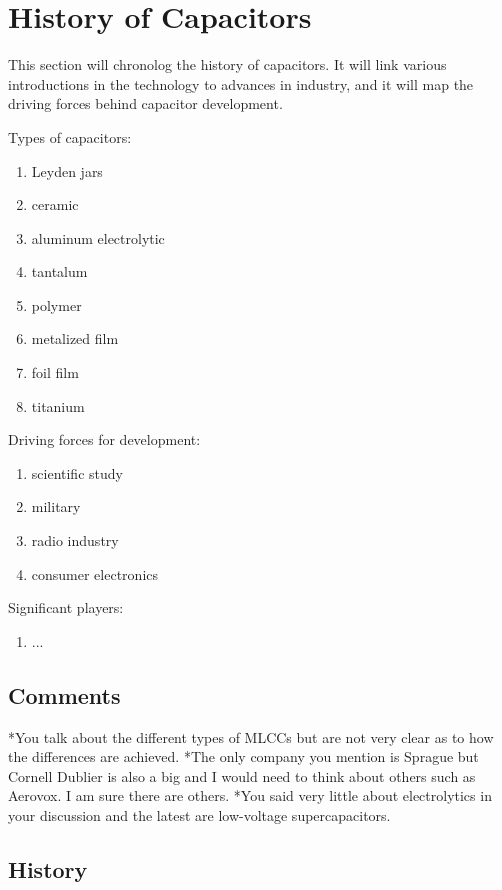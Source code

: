 \section {History of Capacitors}
This section will chronolog the history of capacitors. It will link various introductions in the technology to advances in industry, and it will map the driving forces behind capacitor development.

\noindent Types of capacitors:
\begin{enumerate}
    \item Leyden jars
    \item ceramic 
    \item aluminum electrolytic 
    \item tantalum 
    \item polymer
    \item metalized film
    \item foil film
    \item titanium 
\end {enumerate}

\noindent Driving forces for development:
\begin {enumerate}
    \item scientific study
    \item military
    \item radio industry
    \item consumer electronics
\end {enumerate}

\noindent Significant players:
\begin{enumerate}
    \item ...
\end {enumerate}

\subsection{Comments}
*You talk about the different types of MLCCs but are not very clear as to how the differences are achieved.
*The only company you mention is Sprague but Cornell Dublier is also a big and I would need to think about others such as Aerovox.  I am sure there are others.
*You said very little about electrolytics in your discussion and the latest are low-voltage supercapacitors.

\subsection{History}


